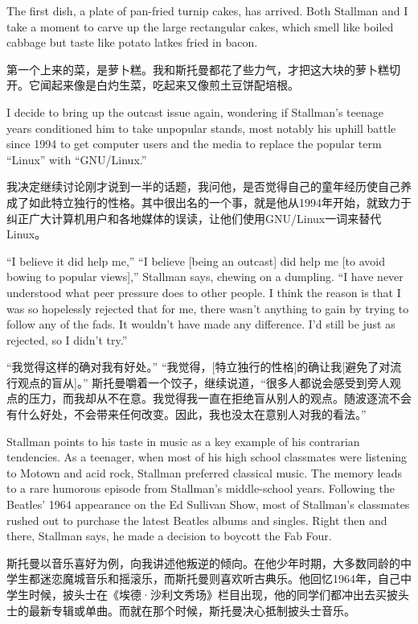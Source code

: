\ifdefined\eng
The first dish, a plate of pan-fried turnip cakes, has arrived. Both Stallman and I take a moment to carve up the large rectangular cakes, which smell like boiled cabbage but taste like potato latkes fried in bacon.
\fi

\ifdefined\chs
第一个上来的菜，是萝卜糕。我和斯托曼都花了些力气，才把这大块的萝卜糕切开。它闻起来像是白灼生菜，吃起来又像煎土豆饼配培根。
\fi

\ifdefined\eng
I decide to bring up the outcast issue again, wondering if Stallman's teenage years conditioned him to take unpopular stands, most notably his uphill battle since 1994 to get computer users and the media to replace the popular term ``Linux'' with ``GNU/Linux.''
\fi

\ifdefined\chs
我决定继续讨论刚才说到一半的话题，我问他，是否觉得自己的童年经历使自己养成了如此特立独行的性格。其中很出名的一个事，就是他从1994年开始，就致力于纠正广大计算机用户和各地媒体的误读，让他们使用GNU/Linux一词来替代Linux。
\fi

\ifdefined\eng
\ifdefined\vone ``I believe it did help me,'' \fi\ifdefined\vtwo``I believe [being an outcast] did help me [to avoid bowing to popular views],'' \fi Stallman says, chewing on a dumpling. ``I have never understood what peer pressure does to other people. I think the reason is that I was so hopelessly rejected that for me, there wasn't anything to gain by trying to follow any of the fads. It wouldn't have made any difference. I'd still be just as rejected, so I didn't try.''
\fi

\ifdefined\chs
\ifdefined\vone ``我觉得这样的确对我有好处。'' \fi\ifdefined\vtwo ``我觉得，[特立独行的性格]的确让我[避免了对流行观点的盲从]。'' \fi 斯托曼嚼着一个饺子，继续说道，``很多人都说会感受到旁人观点的压力，而我却从不在意。我觉得我一直在拒绝盲从别人的观点。随波逐流不会有什么好处，不会带来任何改变。因此，我也没太在意别人对我的看法。''
\fi

\ifdefined\eng
Stallman points to his taste in music as a key example of his contrarian tendencies. As a teenager, when most of his high school classmates were listening to Motown and acid rock, Stallman preferred classical music. The memory leads to a rare humorous episode from Stallman's middle-school years. Following the Beatles' 1964 appearance on the Ed Sullivan Show, most of Stallman's classmates rushed out to purchase the latest Beatles albums and singles. Right then and there, Stallman says, he made a decision to boycott the Fab Four.
\fi

\ifdefined\chs
斯托曼以音乐喜好为例，向我讲述他叛逆的倾向。在他少年时期，大多数同龄的中学生都迷恋魔城音乐和摇滚乐，而斯托曼则喜欢听古典乐。他回忆1964年，自己中学生时候，披头士在《埃德·沙利文秀场》栏目出现，他的同学们都冲出去买披头士的最新专辑或单曲。而就在那个时候，斯托曼决心抵制披头士音乐。
\fi

